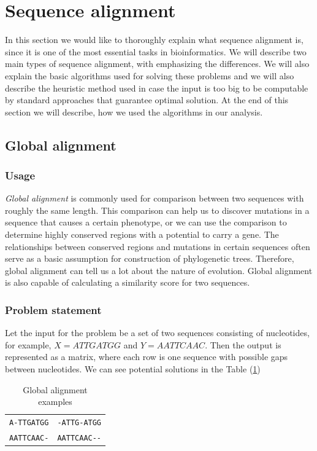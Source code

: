 \section{Sequence alignment}
In this section we would like to thoroughly explain what sequence alignment is, since it is one of the most essential tasks in bioinformatics.
We will describe two main types of sequence alignment, with emphasizing the differences.
We will also explain the basic algorithms used for solving these problems and we will also describe the heuristic method used in case the input is too big to be computable by standard approaches that guarantee optimal solution.
At the end of this section we will describe, how we used the algorithms in our analysis.

\subsection{Global alignment}
\subsubsection{Usage}
\emph{Global alignment} is commonly used for comparison between two sequences with roughly the same length.
This comparison can help us to discover mutations in a sequence that causes a certain phenotype, or we can use the comparison to determine highly conserved regions with a potential to carry a gene.
The relationships between conserved regions and mutations in certain sequences often serve as a basic assumption for construction of phylogenetic trees.
Therefore, global alignment can tell us a lot about the nature of evolution.
Global alignment is also capable of calculating a similarity score for two sequences.

\subsubsection{Problem statement}
Let the input for the problem be a set of two sequences consisting of nucleotides, for example, $ X = ATTGATGG $ and $ Y = AATTCAAC $.
Then the output is represented as a matrix, where each row is one sequence with possible gaps between nucleotides.
We can see potential solutions in the Table (\ref{tab:potsol})

\begin{table}
  \centering
	\begin{tabular}{ l | r }
	\verb|A-TTGATGG| & \verb|-ATTG-ATGG| \\
	\verb|AATTCAAC-| & \verb|AATTCAAC--| \\
	\end{tabular}
  \caption{Global alignment examples}
  \label{tab:potsol}
\end{table}

